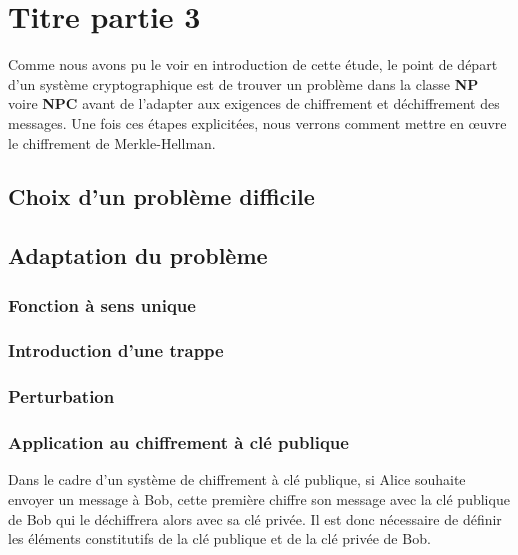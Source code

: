 
\newpage
\section[Chiffrement de Merkle-Hellman]{Titre partie 3}

Comme nous avons pu le voir en introduction de cette étude, le point de départ d'un système cryptographique est de trouver un problème dans la classe \textbf{NP} voire \textbf{NPC} avant de l'adapter aux exigences de chiffrement et déchiffrement des messages. Une fois ces étapes explicitées, nous verrons comment mettre en œuvre le chiffrement de Merkle-Hellman.



\subsection{Choix d'un problème difficile}
\label{problem}





\subsection{Adaptation du problème}



\subsubsection{Fonction à sens unique}




\subsubsection{Introduction d'une trappe}
\label{trappe}



\subsubsection{Perturbation}
\label{clés}



\subsubsection{Application au chiffrement à clé publique}

Dans le cadre d'un système de chiffrement à clé publique, si Alice souhaite envoyer un message à Bob, cette première chiffre son message avec la clé publique de Bob qui le déchiffrera alors avec sa clé privée. Il est donc nécessaire de définir les éléments constitutifs de la clé publique et de la clé privée de Bob.

